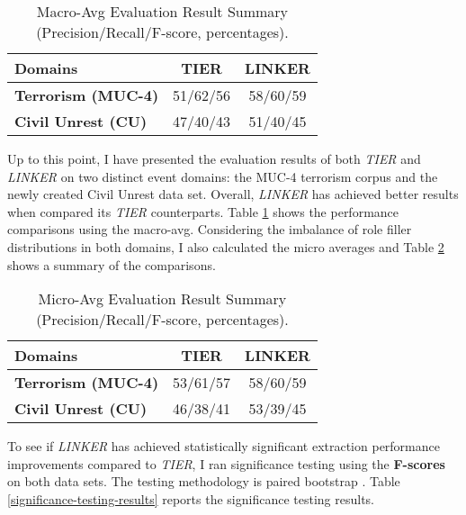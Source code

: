 \begin{table}[t]
\small
\centering
\begin{tabular}[center]{|l|cc|} \hline
{\bf Domains} & {\bf TIER} & {\bf LINKER} \\ \hline

{\bf Terrorism (MUC-4)} & 51/62/56 & 58/60/59 \\ \hline

{\bf Civil Unrest (CU)} & 47/40/43  & 51/40/45 \\ \hline
\end{tabular}
\caption{Macro-Avg Evaluation Result Summary (Precision/Recall/F-score, percentages).}
\label{muc-cu-summary-macro}
\end{table}

Up to this point, I have presented the evaluation results of both {\it TIER} 
and {\it LINKER} on two distinct event domains: the MUC-4 terrorism corpus and the newly 
created Civil Unrest data set. 
Overall, {\it LINKER} has achieved better results when compared its {\it TIER} 
counterparts. 
Table \ref{muc-cu-summary-macro} shows the performance comparisons using the macro-avg. 
Considering the imbalance of role filler distributions in both domains, 
I also calculated the micro averages and Table \ref{muc-cu-summary-micro} shows a summary of the comparisons.


\begin{table}[t]
\small
\centering
\begin{tabular}[center]{|l|cc|} \hline
{\bf Domains} & {\bf TIER} & {\bf LINKER} \\ \hline

{\bf Terrorism (MUC-4)} & 53/61/57 & 58/60/59 \\ \hline

{\bf Civil Unrest (CU)} & 46/38/41 & 53/39/45 \\ \hline
\end{tabular}
\caption{Micro-Avg Evaluation Result Summary (Precision/Recall/F-score, percentages).}
\label{muc-cu-summary-micro}
\end{table}

To see if {\it LINKER}  has achieved statistically significant 
extraction performance improvements compared to {\it TIER}, 
I ran significance testing using the {\bf F-scores} on both data sets. 
The testing methodology is paired
bootstrap \cite{SigTest12}. 
Table \ref{significance-testing-results} reports the significance testing results. 

